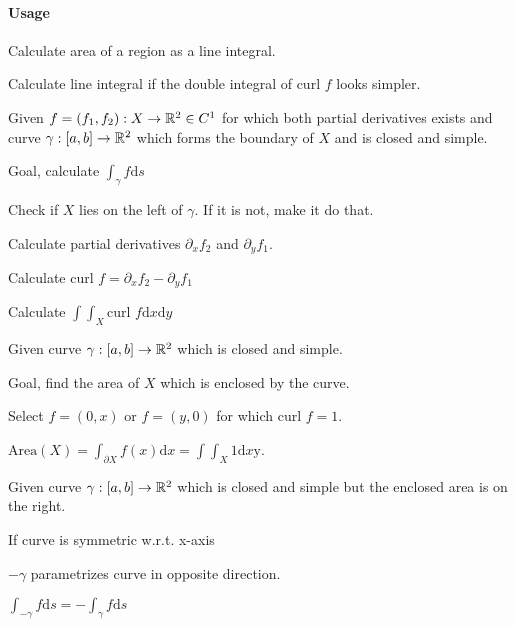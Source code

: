 \paragraph{Usage}
\begin{compactenum}
    \item Calculate area of a region as a line integral.
    \item Calculate line integral if the double integral of $\text{curl }f$ looks simpler.
\end{compactenum}

Given $f = (f_1, f_2): X \to \mathbb{R}^2 \in C^1$ for which both partial derivatives exists and curve $\gamma: [a,  b] \to \mathbb{R}^2$ which forms the boundary of $X$ and is closed and simple.

Goal, calculate $\int_{\gamma} f \mathrm{d}s$

\begin{compactenum}
    \item Check if $X$ lies on the left of $\gamma$. If it is not, make it do that.
    \item Calculate partial derivatives $\partial_x f_2$ and $\partial_y f_1$.
    \item Calculate $\text{curl }f = \partial_x f_2 - \partial_y f_1$
    \item Calculate $\int \int_X \text{curl }f \mathrm{d}x\mathrm{d}y$
\end{compactenum}

Given curve $\gamma: [a,  b] \to \mathbb{R}^2$ which is closed and simple.

Goal, find the area of $X$ which is enclosed by the curve.

\begin{compactenum}
    \item Select $f = (0, x)$ or $f = (y, 0)$ for which $\text{curl }f = 1$.
    \item $\text{Area}(X) = \int_{\partial X} f(x) \mathrm{d}x = \int\int_X 1 \mathrm{d}x\mathrm{y}$.
\end{compactenum}

Given curve $\gamma: [a,  b] \to \mathbb{R}^2$ which is closed and simple but the enclosed area is on the right.

\begin{compactitem}
    \item If curve is symmetric w.r.t. x-axis
        \begin{compactitem}
            \item $-\gamma$ parametrizes curve in opposite direction.
            \item $\int_{-\gamma} f \mathrm{d}s = - \int_{\gamma} f \mathrm{d}s$
        \end{compactitem}
\end{compactitem}


